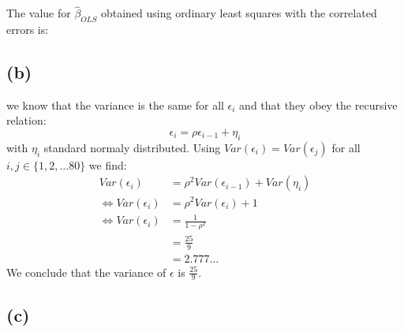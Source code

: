 \documentclass[a4paper]{article}
\begin{document}
The value for $\hat{\beta}_{OLS}$ obtained using ordinary least squares with the correlated errors is:



\subsection*{(b)}
\noindent {}

we know that the variance is the same for all $\epsilon_i$ and that they obey the recursive relation:
\begin{equation*}
	\epsilon_i = \rho \epsilon_{i-1} + \eta_i
\end{equation*}
with $\eta_i$ standard normaly distributed. Using $Var(\epsilon_i) =Var(\epsilon_j)$ for all $i, j \in \{1, 2, \ldots 80\}$ we find:
\begin{align*}
	Var(\epsilon_i) &= \rho^2 Var(\epsilon_{i-1}) + Var(\eta_i)\\
	\Leftrightarrow Var(\epsilon_i) &= \rho^2 Var(\epsilon_i) + 1\\
	\Leftrightarrow Var(\epsilon_i) &= \frac{1}{1-\rho^2}\\
					&= \frac{25}{9}\\
					&= 2.777 \ldots
\end{align*}
We conclude that the variance of $\epsilon$ is $ \frac{25}{9}$.

\subsection*{(c)}
\noindent {}
\end{document}
